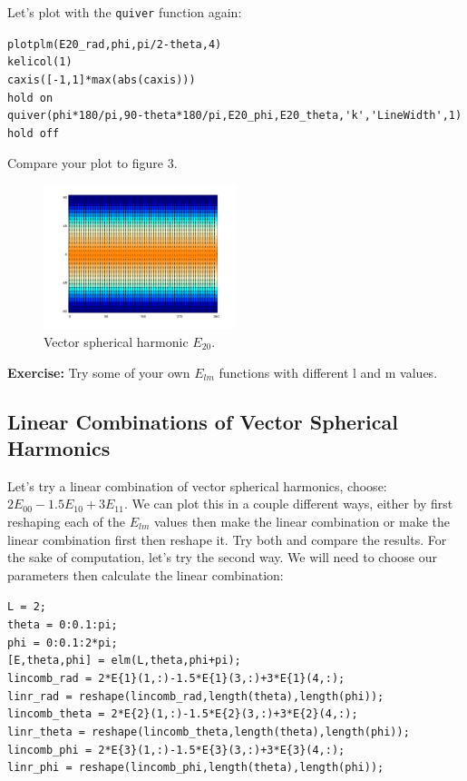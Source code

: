 \documentclass[11pt]{article}
\begin{document}
Let's plot with the \verb|quiver| function again:

\verb|plotplm(E20_rad,phi,pi/2-theta,4)|\\
\verb|kelicol(1)|\\
\verb|caxis([-1,1]*max(abs(caxis)))|\\
\verb|hold on|\\
\verb|quiver(phi*180/pi,90-theta*180/pi,E20_phi,E20_theta,'k','LineWidth',1)|\\
\verb|hold off|

Compare your plot to figure 3.

\begin{figure}[H]
  \centering
  \includegraphics[width=0.5\textwidth]{figures_Rep2/E20_quiver.png}  
  \caption{Vector spherical harmonic $E_{20}$.}
\label{E7}
\end{figure}

\textbf{Exercise:} Try some of your own $E_{lm}$ functions with different l and m values.

\subsection{Linear Combinations of Vector Spherical Harmonics}

Let's try a linear combination of vector spherical harmonics, choose: $2E_{00}-1.5E_{10}+3E_{11}$.  We can plot this in a couple different ways, either by first reshaping each of the $E_{lm}$ values then make the linear combination or make the linear combination first then reshape it.  Try both and compare the results.  For the sake of computation, let's try the second way.  We will need to choose our parameters then calculate the linear combination:

\verb|L = 2;|\\
\verb|theta = 0:0.1:pi;|\\
\verb|phi = 0:0.1:2*pi;|\\
\verb|[E,theta,phi] = elm(L,theta,phi+pi);|\\
\verb|lincomb_rad = 2*E{1}(1,:)-1.5*E{1}(3,:)+3*E{1}(4,:);|\\
\verb|linr_rad = reshape(lincomb_rad,length(theta),length(phi));|\\
\verb|lincomb_theta = 2*E{2}(1,:)-1.5*E{2}(3,:)+3*E{2}(4,:);|\\
\verb|linr_theta = reshape(lincomb_theta,length(theta),length(phi));|\\
\verb|lincomb_phi = 2*E{3}(1,:)-1.5*E{3}(3,:)+3*E{3}(4,:);|\\
\verb|linr_phi = reshape(lincomb_phi,length(theta),length(phi));|\\
\end{document}
